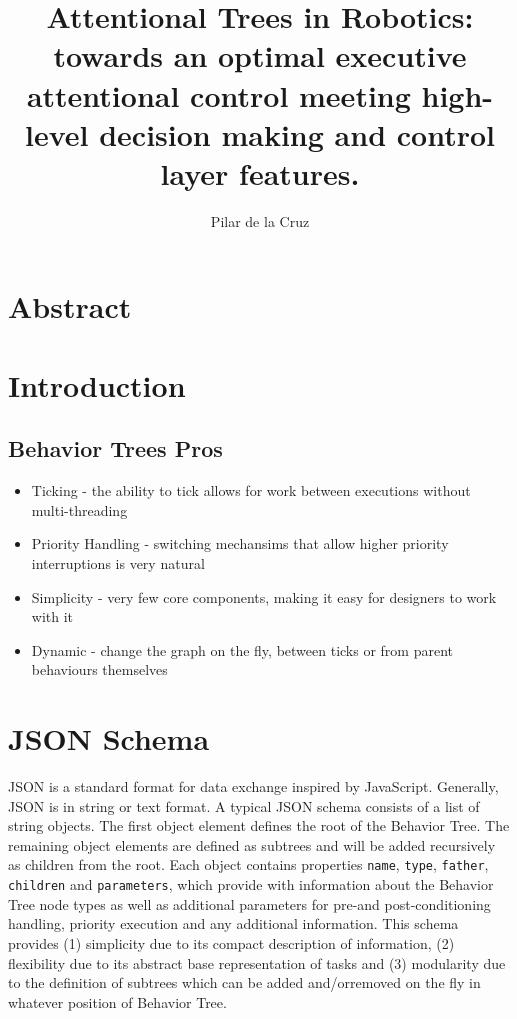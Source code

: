 \documentclass[10pt,a4paper]{article}
\author{Pilar de la Cruz}
\title{Attentional Trees in Robotics: towards an optimal executive attentional control meeting high-level decision making and control layer features.}
\begin{document}
\maketitle
\section*{Abstract}
\section*{Introduction}

 
\subsection*{Behavior Trees Pros}
\begin{itemize}
\item Ticking - the ability to tick allows for work between executions without multi-threading
\item Priority Handling - switching mechansims that allow higher priority interruptions is very natural
\item Simplicity - very few core components, making it easy for designers to work with it
\item Dynamic - change the graph on the fly, between ticks or from parent behaviours themselves
\end{itemize}
\section*{JSON Schema}
JSON is a standard format for data exchange inspired by JavaScript. Generally, JSON is in string or text format. A typical JSON schema consists of a list of string objects. The first object element defines the root of the Behavior Tree. The remaining object elements are defined as subtrees and will be added recursively as children from the root. Each object contains properties \verb|name|, \verb|type|, \verb|father|, \verb|children| and \verb|parameters|, which provide with information about the Behavior Tree node types as well as additional parameters for pre-and post-conditioning handling, priority execution and any additional information. This schema provides (1) simplicity due to its compact description of information, (2) flexibility due to its abstract base representation of tasks and (3) modularity due to the definition of subtrees which can be added and/orremoved on the fly in whatever position of Behavior Tree.
\end{document}
